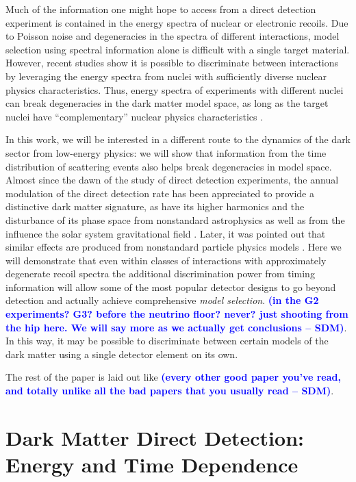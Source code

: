 \documentclass[11pt]{article}
\newcommand{\sdm}[1]{\textcolor{blue}{\textbf{(#1 -- SDM)}}}
\begin{document}
Much of the information one might hope to access from a direct detection experiment is contained in the energy spectra of nuclear or electronic recoils. Due to Poisson noise and degeneracies in the spectra of different interactions, model selection using spectral information alone is difficult with a single target material. However, recent studies show it is possible to discriminate between interactions by leveraging the energy spectra from nuclei with sufficiently diverse nuclear physics characteristics. Thus, energy spectra of experiments with different nuclei can break degeneracies in the dark matter model space, as long as the target nuclei have ``complementary'' nuclear physics characteristics \cite{McDermott:2011hx,Peter:2013aha,Gluscevic:2014vga,Catena:2014epa,Catena:2014hla,Dent:2015zpa,Gluscevic:2015sqa}.

In this work, we will be interested in a different route to the dynamics of the dark sector from low-energy physics: we will show that information from the time distribution of scattering events also helps break degeneracies in model space. Almost since the dawn of the study of direct detection experiments, the annual modulation of the direct detection rate \cite{Freese:1987wu} has been appreciated to provide a distinctive dark matter signature, as have its higher harmonics \cite{Freese:2012xd,Lee:2013xxa} and the disturbance of its phase space from nonstandard astrophysics \cite{Green:2000ga,Gelmini:2000dm} as well as from the influence the solar system gravitational field \cite{Lee:2013wza,DelNobile:2015tza,DelNobile:2015nua,DelNobile:2015rmp}. Later, it was pointed out that similar effects are produced from nonstandard particle physics models \cite{DelNobile:2015tza}. Here we will demonstrate that even within classes of interactions with approximately degenerate recoil spectra the additional discrimination power from timing information will allow some of the most popular detector designs to go beyond detection and actually achieve comprehensive {\it model selection}. \sdm{in the G2 experiments? G3? before the neutrino floor? never? just shooting from the hip here. We will say more as we actually get conclusions}. In this way, it may be possible to discriminate between certain models of the dark matter using a single detector element on its own.

The rest of the paper is laid out like \sdm{every other good paper you've read, and totally unlike all the bad papers that you usually read}.

\section{Dark Matter Direct Detection: Energy and Time Dependence}
\end{document}
